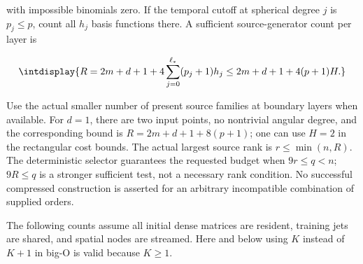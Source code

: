 
with impossible binomials zero. If the temporal cutoff at spherical degree \(j\) is \(p_j\le p\), count all \(h_j\) basis functions there. A sufficient source-generator count per layer is


\begingroup\renewcommand{\theHequation}{intdisplay.285}
\begin{equation}
\intdisplay{
R=2m+d+1+4\sum_{j=0}^{\ell_*}(p_j+1)h_j
 \le2m+d+1+4(p+1)H.
}
\label{int:eq-0112-cost-source-generator-count}
\end{equation}
\endgroup


Use the actual smaller number of present source families at boundary layers when available. For \(d=1\), there are two input points, no nontrivial angular degree, and the corresponding bound is \(R=2m+d+1+8(p+1)\); one can use \(H=2\) in the rectangular cost bounds. The actual largest source rank is \(r\le\min(n,\allowbreak R)\). The deterministic selector guarantees the requested budget when \(9r\le q<n\); \(9R\le q\) is a stronger sufficient test, not a necessary rank condition. No successful compressed construction is asserted for an arbitrary incompatible combination of supplied orders.



The following counts assume all initial dense matrices are resident, training jets are shared, and spatial nodes are streamed. Here and below using \(K\) instead of \(K+1\) in big-O is valid because \(K\ge1\).


